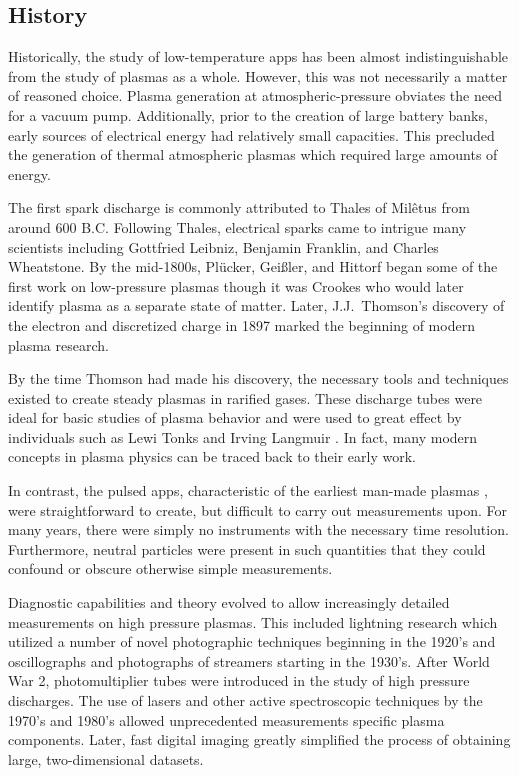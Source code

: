 \subsection{History}

Historically, the study of low-temperature \acs{app}s has been almost
indistinguishable from the study of plasmas as a whole. However, this was not
necessarily a matter of reasoned choice. Plasma generation at
atmospheric-pressure obviates the need for a vacuum pump. Additionally, prior to
the creation of large battery banks, early sources of electrical energy had
relatively small capacities. This precluded the generation of thermal
atmospheric plasmas which required large amounts of energy.

The first spark discharge is commonly attributed to Thales of Mil\^{e}tus from
around 600 B.C. Following Thales, electrical sparks came to intrigue many
scientists including Gottfried Leibniz, Benjamin Franklin, and Charles
Wheatstone. By the mid-1800s, Pl\"{u}cker, Gei\ss{}ler, and Hittorf began some
of the first work on low-pressure plasmas though it was Crookes who would later
identify plasma as a separate state of matter. Later, J.J.\ Thomson's discovery
of the electron and discretized charge in 1897 marked the beginning of modern
plasma research.

By the time Thomson had made his discovery, the necessary tools and techniques
existed to create steady plasmas in rarified gases. These discharge tubes were
ideal for basic studies of plasma behavior and were used to great effect by
individuals such as Lewi Tonks and Irving Langmuir \cite{Tonks1929}. In fact,
many modern concepts in plasma physics can be traced back to their early work.

In contrast, the pulsed \acs{app}s, characteristic of the earliest man-made
plasmas \cite{Anders2003}, were straightforward to create, but difficult to
carry out measurements upon. For many years, there were simply no instruments
with the necessary time resolution. Furthermore, neutral particles were present
in such quantities that they could confound or obscure otherwise simple
measurements.

Diagnostic capabilities and theory evolved to allow increasingly detailed
measurements on high pressure plasmas. This included lightning research which
utilized a number of novel photographic techniques beginning in the 1920's and
oscillographs and photographs of streamers starting in the 1930's. After World
War 2, photomultiplier tubes were introduced in the study of high pressure
discharges. The use of lasers and other active spectroscopic techniques by the
1970's and 1980's allowed unprecedented measurements specific plasma components.
Later, fast digital imaging greatly simplified the process of obtaining large,
two-dimensional datasets.

